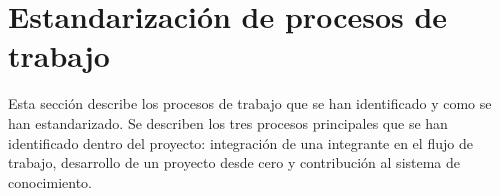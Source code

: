 \section{Estandarización de procesos de trabajo}
Esta sección describe los procesos de trabajo que se
han identificado y como se han estandarizado. Se describen
los tres procesos principales que se han identificado dentro
del proyecto: integración de una integrante en el flujo de trabajo,
desarrollo de un proyecto desde cero y contribución al sistema
de conocimiento.






\pagebreak
